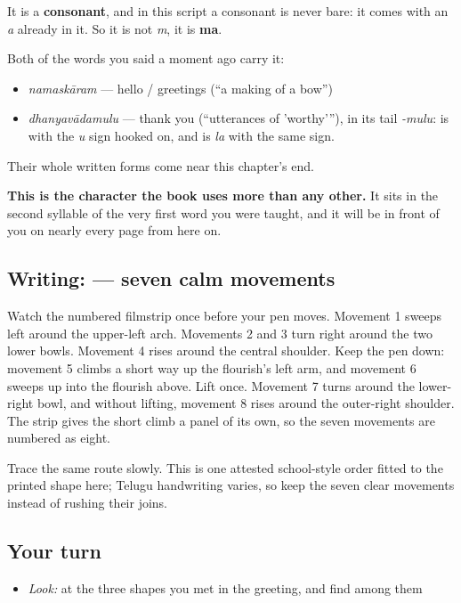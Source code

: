 It is a \textbf{consonant}, and in this script a consonant is never bare: it comes with an \emph{a} already in it. So it is not \emph{m}, it is \textbf{ma}.

Both of the words you said a moment ago carry it:

\begin{itemize}
\raggedright
  \item \emph{namaskāram} — hello / greetings (\textquotedblleft{}a making of a bow\textquotedblright{})
  \item \emph{dhanyavādamulu} — thank you (\textquotedblleft{}utterances of 'worthy'\textquotedblright{}), in its tail \textbf{} \emph{-mulu}: \textbf{} is  with the \emph{u} sign hooked on, and \textbf{} is  \emph{la} with the same sign.
\end{itemize}

Their whole written forms come near this chapter's end.

\textbf{This is the character the book uses more than any other.} It sits in the second syllable of the very first word you were taught, and it will be in front of you on nearly every page from here on.

\subsection*{Writing:  — seven calm movements}

Watch the numbered filmstrip once before your pen moves. Movement 1 sweeps left around the upper-left arch. Movements 2 and 3 turn right around the two lower bowls. Movement 4 rises around the central shoulder. Keep the pen down: movement 5 climbs a short way up the flourish's left arm, and movement 6 sweeps up into the flourish above. Lift once. Movement 7 turns around the lower-right bowl, and without lifting, movement 8 rises around the outer-right shoulder. The strip gives the short climb a panel of its own, so the seven movements are numbered as eight.

Trace the same route slowly. This is one attested school-style order fitted to the printed shape here; Telugu handwriting varies, so keep the seven clear movements instead of rushing their joins.

\subsection*{Your turn}
\begin{itemize}
\raggedright
  \item \emph{Look:} at the three shapes you met in the greeting, and find  among them
\end{itemize}

